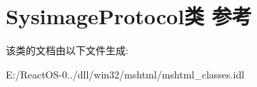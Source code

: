 \hypertarget{class_sysimage_protocol}{}\section{Sysimage\+Protocol类 参考}
\label{class_sysimage_protocol}


该类的文档由以下文件生成\+:\begin{DoxyCompactItemize}
\item 
E\+:/\+React\+O\+S-\/0../dll/win32/mshtml/mshtml\+\_\+classes.\+idl\end{DoxyCompactItemize}
